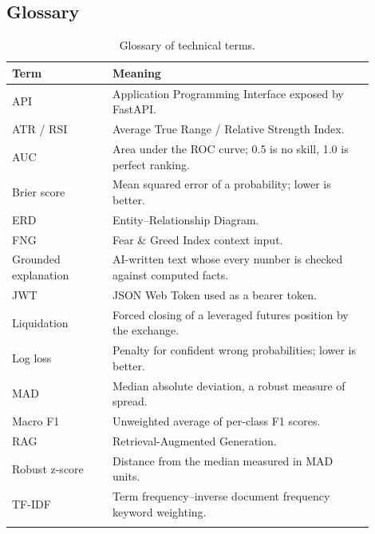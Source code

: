 \subsection{Glossary}
{\renewcommand{\arraystretch}{1.3}
\begin{longtable}{|p{0.25\linewidth}|p{0.65\linewidth}|}
\hline\textbf{Term} & \textbf{Meaning}\\\hline\endhead
API & Application Programming Interface exposed by FastAPI.\\\hline
ATR / RSI & Average True Range / Relative Strength Index.\\\hline
AUC & Area under the ROC curve; 0.5 is no skill, 1.0 is perfect ranking.\\\hline
Brier score & Mean squared error of a probability; lower is better.\\\hline
ERD & Entity--Relationship Diagram.\\\hline
FNG & Fear \& Greed Index context input.\\\hline
Grounded explanation & AI-written text whose every number is checked against computed facts.\\\hline
JWT & JSON Web Token used as a bearer token.\\\hline
Liquidation & Forced closing of a leveraged futures position by the exchange.\\\hline
Log loss & Penalty for confident wrong probabilities; lower is better.\\\hline
MAD & Median absolute deviation, a robust measure of spread.\\\hline
Macro F1 & Unweighted average of per-class F1 scores.\\\hline
RAG & Retrieval-Augmented Generation.\\\hline
Robust z-score & Distance from the median measured in MAD units.\\\hline
TF-IDF & Term frequency--inverse document frequency keyword weighting.\\\hline
\caption{Glossary of technical terms.}\label{tab:glossary}
\end{longtable}}

